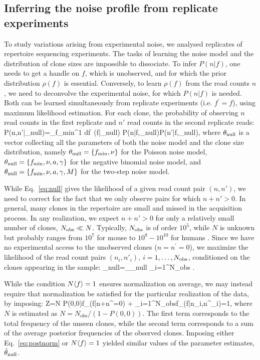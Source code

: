 \subsection*{Inferring the noise profile from replicate experiments} 

To study variations arising from experimental noise, we analysed replicates of repertoire sequencing experiments. The tasks of learning the noise model and the distribution of clone sizes are impossible to dissociate. To infer $P(n|f)$, one needs to get a handle on $f$, which is unobserved, and for which the prior distribution $\rho(f)$ is essential. Conversely, to learn $\rho(f)$ from the read counts $n$, we need to deconvolve the experimental noise, for which $P(n|f)$ is needed. Both can be learned simultaneously from replicate experiments (i.e. $f^\prime=f$), using maximum likelihood estimation. For each clone, the probability of observing $n$ read counts in the first replicate and $n'$ read counts in the second replicate reads:
\beq\label{eq:null}
P(n,n'|\theta_{\rm null})=\int_{f_{\rm min}}^1 \textrm{d}f\, \rho(f|\theta_{\rm null}) P(n|f,\theta_{\rm null})P(n'|f,\theta_{\rm null}),
\eeq
where $\theta_{\rm null}$ is a vector collecting all the parameters of both the noise model and the clone size distribution, namely $\theta_{\rm null}=\{f_{\rm min},\nu\}$ for the Poisson noise model, $\theta_{\rm null}=\{f_{\rm min},\nu,a,\gamma\}$ for the negative binomial noise model, and $\theta_{\rm null}=\{f_{\rm min},\nu,a,\gamma,M\}$ for the two-step noise model.

While Eq.~\ref{eq:null} gives the likelihood of a given read count pair $(n,n')$, we need to correct for the fact that we only observe pairs for which $n+n'>0$. In general,
many clones in the repertoire are small and missed in the acquisition process. In any realization, we expect $n+n'>0$ for only a relatively small number of clones, $N_{\rm obs}\ll N$. Typically, $N_{\rm obs}$ is of order $10^5$, while $N$ is unknown but probably ranges from $10^7$ for mouse to $10^8-10^{10}$ for humans \cite{Qi2014,Lythe2016}. Since we have no experimental access to the unobserved clones ($n=n^{\prime}=0$), we maximize the likelihood of the read count pairs $(n_i,n'_i)$, $i=1,\ldots,N_{\rm obs}$, conditioned on the clones appearing in the sample:
\beq\label{eq:MLE}
\hat\theta_{\rm null}=\argmax_{\theta_{\rm null}} \prod_{i=1}^{N_{\rm obs}} .
\eeq

While the condition $N\langle f\rangle=1$ ensures normalization on average, we may instead require that normalization be satisfied for the particular realization of the data, by imposing:
\beq
	Z=N	P(0,0)\langle f\rangle_{\rho(f|n+n^{\prime}=0)} + \sum_{i=1}^{N_{\textrm{obs}}}\langle f\rangle_{\rho(f|n_i,n^{\prime}_i)}=1,\label{eq:postnorm}
\eeq
where $N$ is estimated as $N=N_{\textrm{obs}}/(1-P(0,0))$. The first term corresponds to the total frequency of the unseen clones, while the second term corresponds to a sum of the average posterior frequencies of the observed clones. Imposing either Eq.~\ref{eq:postnorm} or $N\langle f\rangle=1$ yielded similar values of the parameter estimates, $\hat\theta_{\rm null}$.

